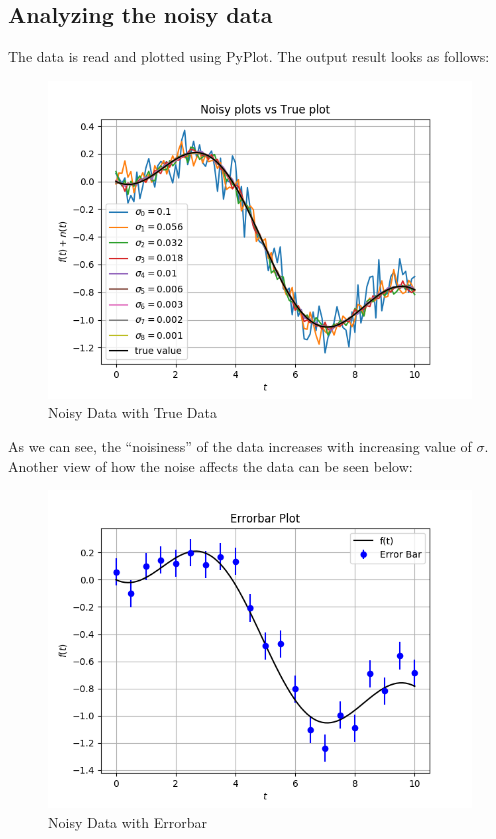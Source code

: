 \documentclass[11pt, a4paper]{article}
\begin{document}
        \subsection{Analyzing the noisy data}
            The data is read and plotted using PyPlot. The output result looks as follows:
            \begin{figure}[H]
                \centering
                \includegraphics[scale=0.5]{Fig 0.png}
                \caption{Noisy Data with True Data}
                \label{fig:noisyAndTrue}
            \end{figure}

            As we can see, the ``noisiness'' of the data increases with increasing value of $\sigma$. Another view of how the noise affects the data can be seen below:
            \begin{figure}[H]
                \centering
                \includegraphics[scale=0.5]{Fig 1.png}
                \caption{Noisy Data with Errorbar}
                \label{fig:noiseError}
            \end{figure}
\end{document}
